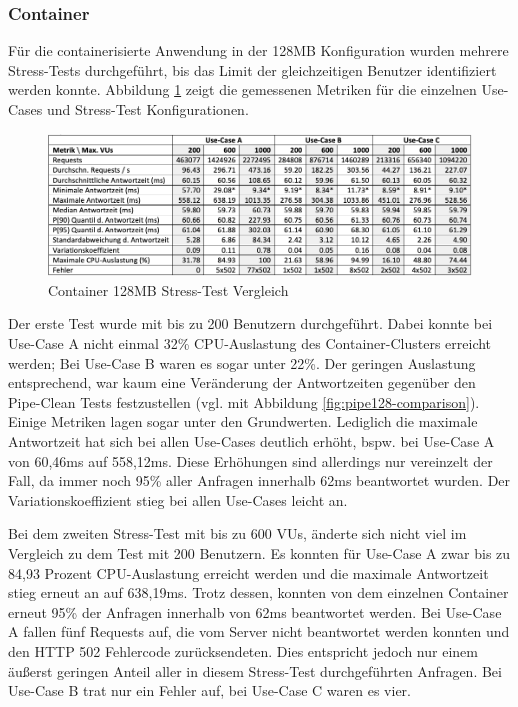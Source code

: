 \subsubsection{Container}
Für die containerisierte Anwendung in der 128MB Konfiguration wurden mehrere Stress-Tests durchgeführt, bis das Limit der gleichzeitigen Benutzer identifiziert werden konnte. Abbildung \ref{fig:fargate128-stress-comparison} zeigt die gemessenen Metriken für die einzelnen Use-Cases und Stress-Test Konfigurationen. 

\begin{figure}[H]
    \includegraphics[width=\textwidth]{img/fargate128-stress-comparison.png}
    \caption[Container 128MB Stress-Test Vergleich]{Container 128MB Stress-Test Vergleich}
    \label{fig:fargate128-stress-comparison}
\end{figure}

Der erste Test wurde mit bis zu 200 Benutzern durchgeführt. Dabei konnte bei Use-Case A nicht einmal 32\% CPU-Auslastung des Container-Clusters erreicht werden; Bei Use-Case B waren es sogar unter 22\%. Der geringen Auslastung entsprechend, war kaum eine Veränderung der Antwortzeiten gegenüber den Pipe-Clean Tests festzustellen (vgl. mit Abbildung \ref{fig:pipe128-comparison}). Einige Metriken lagen sogar unter den Grundwerten. Lediglich die maximale Antwortzeit hat sich bei allen Use-Cases deutlich erhöht, bspw. bei Use-Case A von 60,46ms auf 558,12ms. Diese Erhöhungen sind allerdings nur vereinzelt der Fall, da immer noch 95\% aller Anfragen innerhalb 62ms beantwortet wurden. Der Variationskoeffizient stieg bei allen Use-Cases leicht an. 

Bei dem zweiten Stress-Test mit bis zu 600 \acp{VU}, änderte sich nicht viel im Vergleich zu dem Test mit 200 Benutzern. Es konnten für Use-Case A zwar bis zu 84,93 Prozent CPU-Auslastung erreicht werden und die maximale Antwortzeit stieg erneut an auf 638,19ms. Trotz dessen, konnten von dem einzelnen Container erneut 95\% der Anfragen innerhalb von 62ms beantwortet werden. Bei Use-Case A fallen fünf Requests auf, die vom Server nicht beantwortet werden konnten und den HTTP 502 Fehlercode zurücksendeten. Dies entspricht jedoch nur einem äußerst geringen Anteil aller in diesem Stress-Test durchgeführten Anfragen. Bei Use-Case B trat nur ein Fehler auf, bei Use-Case C waren es vier.

